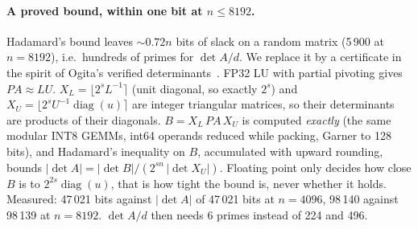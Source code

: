 \documentclass[11pt]{article}
\begin{document}
\paragraph{A proved bound, within one bit at $n\le8192$.} Hadamard's bound leaves $\sim0.72n$ bits of slack on a random matrix (5\,900 at
$n=8192$), i.e.\ hundreds of primes for $\det A/d$. We replace it by a certificate in the spirit of Ogita's verified
determinants~\cite{ogita}. FP32 LU with partial pivoting gives $PA\approx LU$. $X_L=\lfloor2^sL^{-1}\rceil$ (unit diagonal,
so exactly $2^s$) and $X_U=\lfloor2^sU^{-1}\operatorname{diag}(u)\rceil$ are integer triangular matrices, so their determinants
are products of their diagonals. $B=X_L\,PA\,X_U$ is computed \emph{exactly} (the same modular INT8 GEMMs, int64 operands
reduced while packing, Garner to 128 bits), and Hadamard's inequality on $B$, accumulated with upward rounding, bounds
$|\det A| = |\det B|/(2^{sn}\,|\det X_U|)$. Floating point only decides how close $B$ is to $2^{2s}\operatorname{diag}(u)$,
that is how tight the bound is, never whether it holds. Measured: 47\,021 bits against $|\det A|$ of 47\,021 bits at $n=4096$,
98\,140 against 98\,139 at $n=8192$. $\det A/d$ then needs 6 primes instead of 224 and 496.
\end{document}
